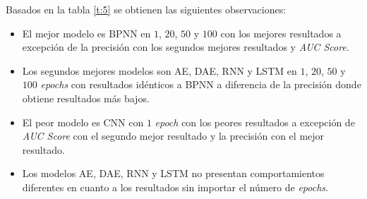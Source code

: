 Basados en la tabla \ref{t:5} se obtienen las siguientes observaciones:
\begin{itemize}
	\item El mejor modelo es BPNN en $1$, $20$, $50$ y $100$ con los mejores resultados a excepci\'{o}n de la precisi\'{o}n con los segundos mejores resultados y \textit{AUC Score}.
	\item Los segundos mejores modelos son AE, DAE, RNN y LSTM en $1$, $20$, $50$ y $100$ \textit{epochs} con resultados id\'{e}nticos a BPNN a diferencia de la precisi\'{o}n donde obtiene resultados m\'{a}s bajos.
	\item El peor modelo es CNN con $1$ \textit{epoch} con los peores resultados a excepci\'{o}n de \textit{AUC Score} con el segundo mejor resultado y la precisi\'{o}n con el mejor resultado.
	\item Los modelos AE, DAE, RNN y LSTM no presentan comportamientos diferentes en cuanto a los resultados sin importar el n\'{u}mero de \textit{epochs}.
\end{itemize}

